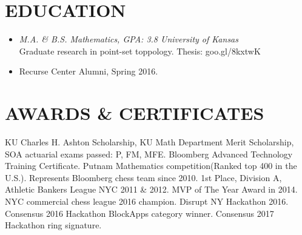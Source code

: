 \documentclass[margin]{res}
\begin{document}
\begin{resume}
\section{EDUCATION} 
                \begin {itemize}

	    \item {\sl M.A. \& B.S. Mathematics, GPA: 3.8 University of Kansas}\\
		Graduate research in point-set toppology. Thesis: goo.gl/8kxtwK
	    \item Recurse Center Alumni, Spring 2016.
		\end {itemize}

			 \section{AWARDS \& CERTIFICATES}
            KU Charles H. Ashton Scholarship, KU Math Department Merit Scholarship, SOA actuarial exams passed: P, FM, MFE. Bloomberg Advanced Technology Training Certificate. 
         Putnam Mathematics competition(Ranked top 400 in the U.S.). Represents Bloomberg chess team since 2010. 1st Place, Division A, Athletic Bankers League NYC 2011 \& 2012. MVP of The Year Award in 2014. NYC commercial chess league 2016 champion. Disrupt NY Hackathon 2016. Consensus 2016 Hackathon BlockApps category winner. Consensus 2017 Hackathon ring signature.
\end{resume}
\end{document}
